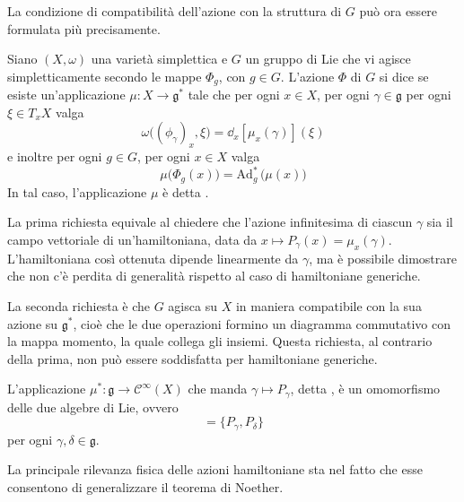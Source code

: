 La condizione di compatibilità dell'azione con la struttura di $G$ può ora essere formulata più precisamente. 
\begin{definition}
  Siano $(X, \omega)$ una varietà simplettica e $G$ un gruppo di Lie che vi agisce simpletticamente secondo le mappe $\Phi_g$, con $g \in G$. L'azione $\Phi$ di $G$ si dice  se esiste un'applicazione $\mu: X \to \mathfrak{g}^*$ tale che  per ogni $x \in X$, per ogni $\gamma \in \mathfrak{g}$ per ogni $\xi \in T_x X$ valga
  \begin{equation*}
  \omega\big((\phi_{\gamma})_x, \xi\big) = \dd_x [\mu_x(\gamma)](\xi)
  \end{equation*} 
  e inoltre per ogni $g \in G$, per ogni $x \in X$ valga
  \begin{equation*}
  \mu\big(\Phi_g(x)\big) = \mathrm{Ad}_g^*\, \big(\mu(x)\big)
  \end{equation*} 
  In tal caso, l'applicazione $\mu$ è detta .
\end{definition}
\begin{remark}
  La prima richiesta equivale al chiedere che l'azione infinitesima di ciascun $\gamma$ sia il campo vettoriale di un'hamiltoniana, data da $x \mapsto P_{\gamma}(x) = \mu_x(\gamma)$. L'hamiltoniana così ottenuta dipende linearmente da $\gamma$, ma è possibile dimostrare che non c'è perdita di generalità rispetto al caso di hamiltoniane generiche.
\end{remark}
\begin{remark}
  La seconda richiesta è che $G$ agisca su $X$ in maniera compatibile con la sua azione su $\mathfrak{g}^*$, cioè che le due operazioni formino un diagramma commutativo con la mappa momento, la quale collega gli insiemi. Questa richiesta, al contrario della prima, non può essere soddisfatta per hamiltoniane generiche.
\end{remark}
\begin{remark}
  L'applicazione $\mu^*:\mathfrak{g} \to \mathcal{C}^{\infty}(X)$ che manda $\gamma \mapsto P_{\gamma}$, detta , è un omomorfismo delle due algebre di Lie, ovvero 
  \begin{equation*}
  [\gamma,\delta] = \{P_{\gamma}, P_{\delta}\} 
  \end{equation*} 
  per ogni $\gamma,\delta \in \mathfrak{g}$.
\end{remark}

La principale rilevanza fisica delle azioni hamiltoniane sta nel fatto che esse consentono di generalizzare il teorema di Noether.

